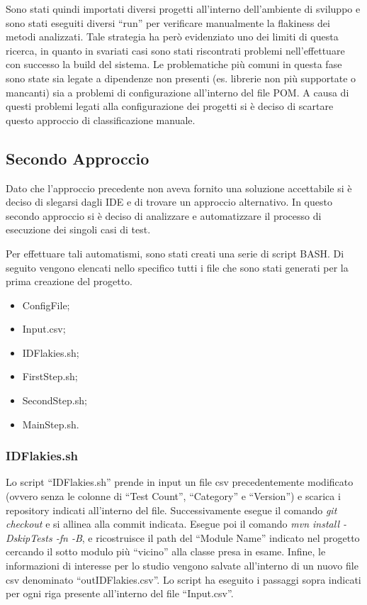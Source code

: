 Sono stati quindi importati diversi progetti all’interno dell’ambiente di sviluppo e sono stati eseguiti diversi “run” per verificare manualmente la flakiness dei metodi analizzati. Tale strategia ha però evidenziato uno dei limiti di questa
ricerca, in quanto in svariati casi sono stati riscontrati problemi nell’effettuare con successo la build del sistema. Le problematiche più comuni in questa fase sono state sia legate a dipendenze non presenti (es. librerie non più supportate o mancanti) sia
a problemi di configurazione all’interno del file POM. A causa di questi problemi legati alla configurazione dei progetti si è deciso di scartare questo approccio di classificazione manuale.
\subsection{Secondo Approccio}
Dato che l’approccio precedente non aveva fornito una soluzione accettabile si è deciso di slegarsi dagli IDE e di trovare un approccio alternativo. In questo secondo approccio si è deciso di analizzare e automatizzare il processo di esecuzione dei singoli casi di test.

Per effettuare tali automatismi, sono stati creati una serie di script BASH. Di seguito vengono elencati nello specifico tutti i file che sono stati generati per la prima creazione del progetto.
\begin{itemize}
	\item ConfigFile;
	\item Input.csv;
	\item IDFlakies.sh;
	\item FirstStep.sh;
	\item SecondStep.sh;
	\item MainStep.sh.
\end{itemize}

\subsubsection{IDFlakies.sh}
Lo script “IDFlakies.sh” prende in input un file csv precedentemente
modificato (ovvero senza le colonne di “Test Count”, “Category” e “Version”) e scarica i repository indicati all’interno del file. Successivamente esegue il comando \emph{git checkout} e si allinea alla commit indicata. Esegue poi il comando \emph{mvn install -
DskipTests -fn -B}, e ricostruisce il path del “Module Name” indicato nel progetto cercando il sotto modulo più “vicino” alla classe presa in esame. Infine, le informazioni di interesse per lo studio vengono salvate all’interno di un nuovo file csv denominato “outIDFlakies.csv”. Lo script ha eseguito i passaggi sopra indicati per ogni riga presente all'interno del file “Input.csv”.
